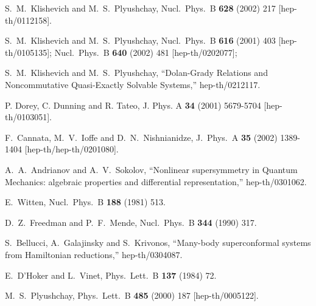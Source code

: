 \documentclass[a4paper,12pt]{article}
\begin{document}
\begin{thebibliography}{99}
S.~M.~Klishevich and M.~S.~Plyushchay,
Nucl.\ Phys.\ B {\bf 628} (2002) 217
[hep-th/0112158].


S.~M.~Klishevich and M.~S.~Plyushchay,
Nucl.\ Phys.\ B {\bf 616} (2001) 403
[hep-th/0105135];
Nucl.\ Phys.\ B {\bf 640} (2002) 481
[hep-th/0202077];

S.~M.~Klishevich and M.~S.~Plyushchay,
``Dolan-Grady Relations and Noncommutative Quasi-Exactly
Solvable Systems,''
hep-th/0212117.


P. Dorey, C. Dunning and R. Tateo,
J. Phys. A {\bf 34} (2001) 5679-5704
[hep-th/0103051].


F.~Cannata, M.~V.~Ioffe and D.~N.~Nishnianidze,
J.\ Phys.\ A {\bf 35} (2002) 1389-1404
[hep-th/hep-th/0201080].



A.~A.~Andrianov and A.~V.~Sokolov,
``Nonlinear supersymmetry in Quantum Mechanics:
algebraic properties and differential representation,''
hep-th/0301062.


E.~Witten,
Nucl.\ Phys.\ B {\bf 188} (1981) 513.


D.~Z.~Freedman and P.~F.~Mende,
Nucl.\ Phys.\ B {\bf 344} (1990) 317.


S.~Bellucci, A.~Galajinsky and S.~Krivonos,
``Many-body superconformal systems from Hamiltonian
reductions,''
hep-th/0304087.


E.~D'Hoker and L.~Vinet,
Phys.\ Lett.\ B {\bf 137} (1984) 72.


M.~S.~Plyushchay,
Phys.\ Lett.\ B {\bf 485} (2000) 187
[hep-th/0005122].

\end{thebibliography}
\end{document}
